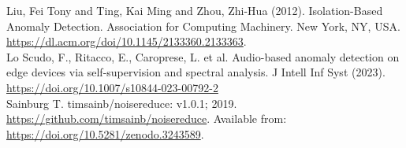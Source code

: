 \documentclass[letterpaper, 12pt]{article}
\begin{document}
\noindent Liu, Fei Tony and Ting, Kai Ming and Zhou, Zhi-Hua (2012). Isolation-Based Anomaly Detection. Association for Computing Machinery. New York, NY, USA. \url{https://dl.acm.org/doi/10.1145/2133360.2133363}.\\

\noindent Lo Scudo, F., Ritacco, E., Caroprese, L. et al. Audio-based anomaly detection on edge devices via self-supervision and spectral analysis. J Intell Inf Syst (2023). \url{https://doi.org/10.1007/s10844-023-00792-2}\\

\noindent Sainburg T. timsainb/noisereduce: v1.0.1; 2019. \url{https://github.com/timsainb/noisereduce}. Available from: \url{https://doi.org/10.5281/zenodo.3243589}.\\
\end{document}
